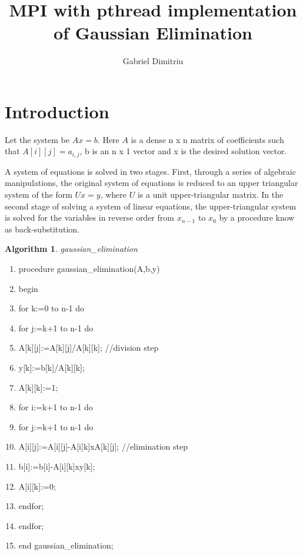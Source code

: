 \documentclass[a4paper]{article}
\newtheorem{algorithm}[theorem]{Algorithm}
\begin{document}
\title{MPI with pthread implementation of Gaussian Elimination}
\date{}
\author{Gabriel Dimitriu}
\maketitle

\section{\protect\bigskip Introduction}

Let the system be $Ax=b$. Here $A$ is a dense n x n matrix of coefficients
such that $A[i][j]=a_{i,j}$, b is an n x 1 vector and x is the desired
solution vector.

A system of equations is solved in two stages. First, through a series of
algebraic manipulations, the original system of equations is reduced to an
upper triangular system of the form $Ux=y$, where $U$ is a unit
upper-triangular matrix. In the second stage of solving a system of linear
equations, the upper-triangular system is solved for the variables in
reverse order from $x_{n-1}$ to $x_{0}$ by a procedure know as
back-substitution.

\begin{algorithm}
gaussian\_elimination
\end{algorithm}

\begin{enumerate}
\item procedure gaussian\_elimination(A,b,y)

\item begin

\item \qquad for k:=0 to n-1 do

\item \qquad \qquad \qquad for j:=k+1 to n-1 do

\item \qquad \qquad \qquad \qquad A[k][j]:=A[k][j]/A[k][k]; //division step

\item \qquad \qquad y[k]:=b[k]/A[k][k];

\item \qquad \qquad A[k][k]:=1;

\item \qquad \qquad for i:=k+1 to n-1 do

\item \qquad \qquad \qquad \qquad for j:=k+1 to n-1 do

\item \qquad \qquad \qquad \qquad A[i][j]:=A[i][j]-A[i]k]xA[k][j];
//elimination step

\item \qquad \qquad \qquad b[i]:=b[i]-A[i][k]xy[k];

\item \qquad \qquad \qquad A[i][k]:=0;

\item \qquad \qquad endfor;

\item \qquad endfor;

\item end gaussian\_elimination;
\end{enumerate}
\end{document}

